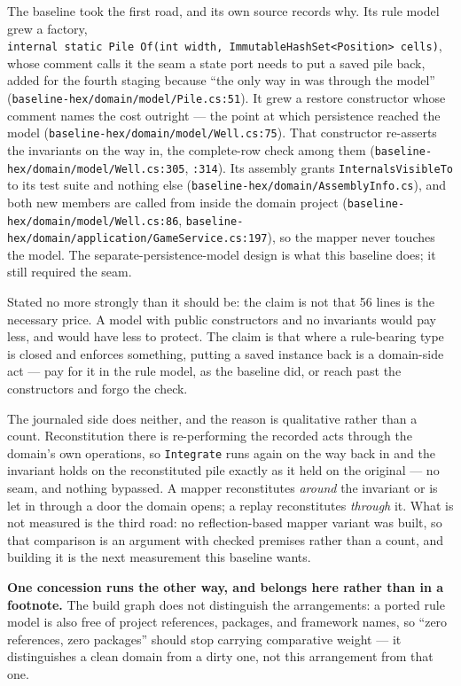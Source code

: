 \documentclass[
]{article}
\begin{document}
The baseline took the first road, and its own source records why. Its
rule model grew a factory,
\texttt{internal\ static\ Pile\ Of(int\ width,\ ImmutableHashSet\textless{}Position\textgreater{}\ cells)},
whose comment calls it the seam a state port needs to put a saved pile
back, added for the fourth staging because ``the only way in was through
the model'' (\texttt{baseline-hex/domain/model/Pile.cs:51}). It grew a
restore constructor whose comment names the cost outright --- the point
at which persistence reached the model
(\texttt{baseline-hex/domain/model/Well.cs:75}). That constructor
re-asserts the invariants on the way in, the complete-row check among
them (\texttt{baseline-hex/domain/model/Well.cs:305}, \texttt{:314}).
Its assembly grants \texttt{InternalsVisibleTo} to its test suite and
nothing else (\texttt{baseline-hex/domain/AssemblyInfo.cs}), and both
new members are called from inside the domain project
(\texttt{baseline-hex/domain/model/Well.cs:86},
\texttt{baseline-hex/domain/application/GameService.cs:197}), so the
mapper never touches the model. The separate-persistence-model design is
what this baseline does; it still required the seam.

Stated no more strongly than it should be: the claim is not that 56
lines is the necessary price. A model with public constructors and no
invariants would pay less, and would have less to protect. The claim is
that where a rule-bearing type is closed and enforces something, putting
a saved instance back is a domain-side act --- pay for it in the rule
model, as the baseline did, or reach past the constructors and forgo the
check.

The journaled side does neither, and the reason is qualitative rather
than a count. Reconstitution there is re-performing the recorded acts
through the domain's own operations, so \texttt{Integrate} runs again on
the way back in and the invariant holds on the reconstituted pile
exactly as it held on the original --- no seam, and nothing bypassed. A
mapper reconstitutes \emph{around} the invariant or is let in through a
door the domain opens; a replay reconstitutes \emph{through} it. What is
not measured is the third road: no reflection-based mapper variant was
built, so that comparison is an argument with checked premises rather
than a count, and building it is the next measurement this baseline
wants.

\textbf{One concession runs the other way, and belongs here rather than
in a footnote.} The build graph does not distinguish the arrangements: a
ported rule model is also free of project references, packages, and
framework names, so ``zero references, zero packages'' should stop
carrying comparative weight --- it distinguishes a clean domain from a
dirty one, not this arrangement from that one.
\end{document}

